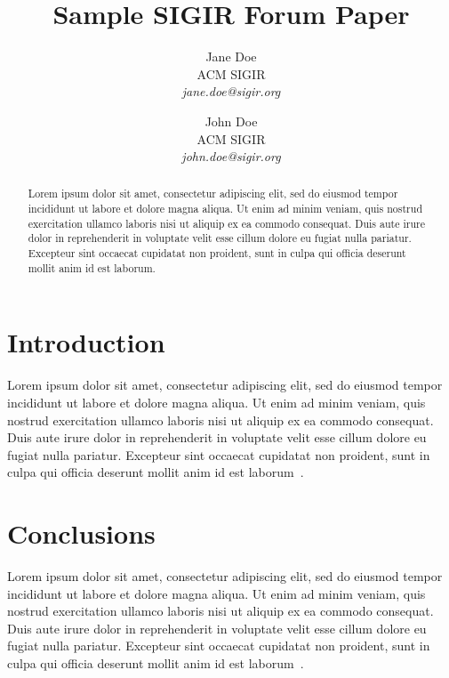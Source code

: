 \documentclass[]{sigir_forum}
\begin{document}
\title{Sample SIGIR Forum Paper}

\author{
Jane Doe\\ACM SIGIR\\\emph{jane.doe@sigir.org}
\and
John Doe\\ACM SIGIR\\\emph{john.doe@sigir.org}
}

\maketitle 
\begin{abstract}
Lorem ipsum dolor sit amet, consectetur adipiscing elit, sed do eiusmod tempor incididunt ut labore et dolore magna aliqua. Ut enim ad minim veniam, quis nostrud exercitation ullamco laboris nisi ut aliquip ex ea commodo consequat. Duis aute irure dolor in reprehenderit in voluptate velit esse cillum dolore eu fugiat nulla pariatur. Excepteur sint occaecat cupidatat non proident, sunt in culpa qui officia deserunt mollit anim id est laborum.
\end{abstract}

\section{Introduction}

Lorem ipsum dolor sit amet, consectetur adipiscing elit, sed do eiusmod tempor incididunt ut labore et dolore magna aliqua. Ut enim ad minim veniam, quis nostrud exercitation ullamco laboris nisi ut aliquip ex ea commodo consequat. Duis aute irure dolor in reprehenderit in voluptate velit esse cillum dolore eu fugiat nulla pariatur. Excepteur sint occaecat cupidatat non proident, sunt in culpa qui officia deserunt mollit anim id est laborum~\citep{forum}.

\section{Conclusions}

Lorem ipsum dolor sit amet, consectetur adipiscing elit, sed do eiusmod tempor incididunt ut labore et dolore magna aliqua. Ut enim ad minim veniam, quis nostrud exercitation ullamco laboris nisi ut aliquip ex ea commodo consequat. Duis aute irure dolor in reprehenderit in voluptate velit esse cillum dolore eu fugiat nulla pariatur. Excepteur sint occaecat cupidatat non proident, sunt in culpa qui officia deserunt mollit anim id est laborum~\citet{forum}.


\end{document}
